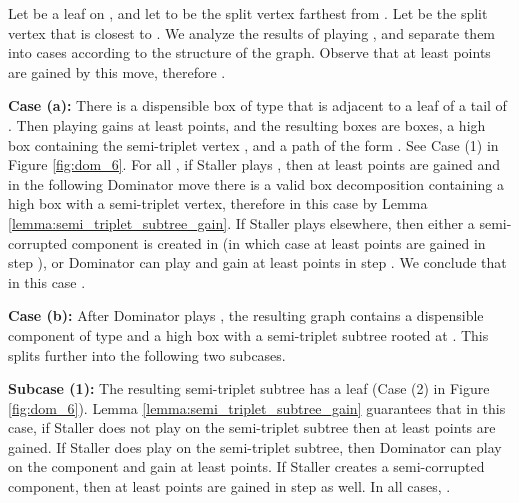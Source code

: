 \documentclass[11pt]{article}
\theoremstyle{definition}
\begin{document}
Let  be a leaf on , 
and let  to be the split vertex farthest from .
Let  be the split vertex that is closest to .
We analyze the results of playing , and separate them into cases according to the structure of the graph.
Observe that at least  points are gained by this move, therefore .

\bigskip
\par\noindent
{\bf Case (a):}
There is a dispensible box of type  that is adjacent to a leaf of a tail of .
Then playing  gains at least  points, and the resulting boxes are  boxes, a high box containing the semi-triplet vertex , and a path  of the form . 
See Case (1) in Figure \ref{fig:dom_6}.
For all , 
if Staller plays , then at least  points are gained 
and in the following Dominator move there is a valid box decomposition containing a high box with a semi-triplet vertex, therefore in this case  by Lemma \ref{lemma:semi_triplet_subtree_gain}. 
If Staller plays elsewhere, 
then either a semi-corrupted component is created in  (in which case at least  points are gained in step ), 
or Dominator can play  and gain at least  points in step .
We conclude that in this case . 	
\bigskip
\par\noindent
{\bf Case (b):}
After Dominator plays , the resulting graph  contains 
a dispensible component of type  and a high box with a semi-triplet subtree rooted at . This splits further into the following two subcases.

\smallskip
\par\noindent
{\bf Subcase (1):}
The resulting semi-triplet subtree has a  leaf (Case (2) in Figure \ref{fig:dom_6}).
Lemma \ref{lemma:semi_triplet_subtree_gain} guarantees that in this case, if Staller does not play on the semi-triplet subtree then at least  points are gained.
If Staller does play on the semi-triplet subtree, then Dominator can play on the  component and gain at least  points.
If Staller creates a semi-corrupted component, then at least  points are gained in step  as well.
In all cases, .
\end{document}
